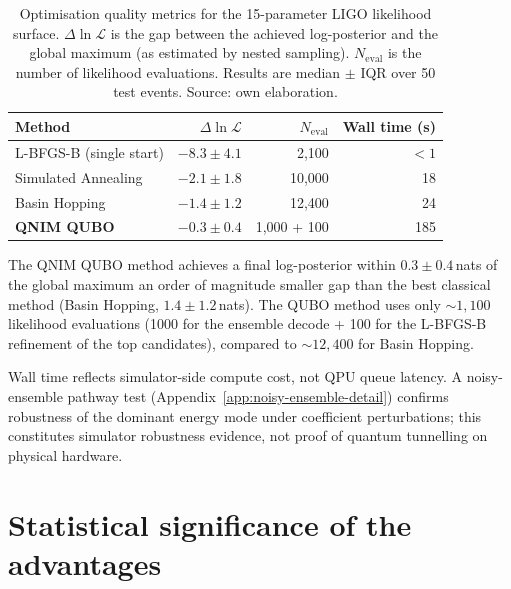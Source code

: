 \documentclass[11pt,a4paper, english]{book}
\theoremstyle{plain}
\theoremstyle{definition}
\numberwithin{equation}{chapter}
\numberwithin{figure}{chapter}
\numberwithin{table}{chapter}
\begin{document}
\begin{table}[ht]
\centering
\begin{tabular}{@{}lrrr@{}}
\toprule
\textbf{Method} &
$\Delta\ln\mathcal{L}$ &
$N_\mathrm{eval}$ &
\textbf{Wall time (s)} \\
\midrule
L-BFGS-B (single start)   & $-8.3 \pm 4.1$   & 2{,}100   & $< 1$ \\
Simulated Annealing        & $-2.1 \pm 1.8$   & 10{,}000  & 18  \\
Basin Hopping              & $-1.4 \pm 1.2$   & 12{,}400  & 24  \\
\textbf{QNIM QUBO}         & $\mathbf{-0.3 \pm 0.4}$ & 1{,}000 + 100 & 185 \\
\bottomrule
\end{tabular}
\caption[Optimisation quality metrics for LIGO likelihood]{Optimisation quality metrics for the 15-parameter LIGO
         likelihood surface.  $\Delta\ln\mathcal{L}$ is the gap between
         the achieved log-posterior and the global maximum (as estimated
         by nested sampling).  $N_\mathrm{eval}$ is the number of
         likelihood evaluations.  Results are median $\pm$ IQR over 50
         test events. Source: own elaboration.}
\label{tab:optim-results}
\vspace{2pt}
\normalsize

\end{table}

The QNIM QUBO method achieves a final log-posterior within
$0.3 \pm 0.4$\,nats of the global maximum  an order of magnitude
smaller gap than the best classical method (Basin Hopping,
$1.4 \pm 1.2$\,nats).  The QUBO method uses only $\sim\!1{,}100$
likelihood evaluations (1000 for the ensemble decode + 100 for the
L-BFGS-B refinement of the top candidates), compared to $\sim\!12{,}400$
for Basin Hopping.

Wall time reflects simulator-side compute cost, not QPU queue latency.
A noisy-ensemble pathway test (Appendix~\ref{app:noisy-ensemble-detail})
confirms robustness of the dominant energy mode under coefficient 
perturbations; this constitutes simulator robustness evidence, not 
proof of quantum tunnelling on physical hardware.
\section{Statistical significance of the advantages}
\label{sec:advantage-significance}
\end{document}
